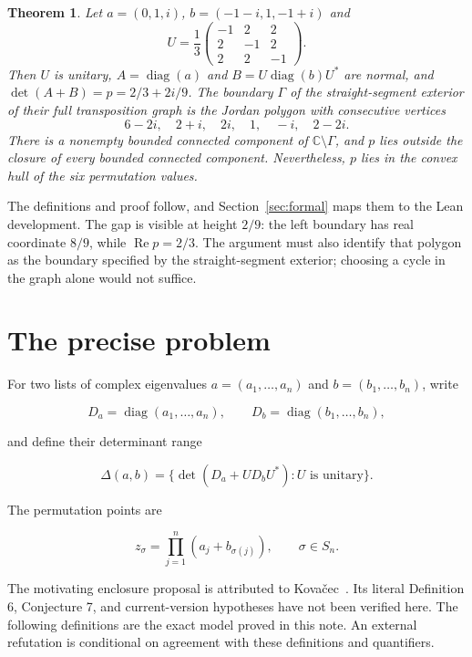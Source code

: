 \documentclass[11pt]{article}
\newtheorem{theorem}{Theorem}
\begin{document}
\begin{theorem}\label{thm:main}
Let $a=(0,1,i)$, $b=(-1-i,1,-1+i)$ and
\[
 U=\frac13\begin{pmatrix}-1&2&2\\2&-1&2\\2&2&-1\end{pmatrix}.
\]
Then $U$ is unitary, $A=\operatorname{diag}(a)$ and $B=U\operatorname{diag}(b)U^*$ are normal, and $\det(A+B)=p=2/3+2i/9$.
The boundary $\Gamma$ of the straight-segment exterior of their full transposition graph is the Jordan polygon with consecutive vertices
\[
 6-2i,\quad2+i,\quad2i,\quad1,\quad-i,\quad2-2i.
\]
There is a nonempty bounded connected component of $\mathbb C\setminus\Gamma$, and $p$ lies outside the closure of every bounded connected component. Nevertheless, $p$ lies in the convex hull of the six permutation values.
\end{theorem}

The definitions and proof follow, and Section~\ref{sec:formal} maps them to the Lean development. The gap is visible at height $2/9$: the left boundary has real coordinate $8/9$, while $\operatorname{Re}p=2/3$. The argument must also identify that polygon as the boundary specified by the straight-segment exterior; choosing a cycle in the graph alone would not suffice.

\section{The precise problem}\label{the-precise-problem}

For two lists of complex eigenvalues \(a=(a_1,\ldots,a_n)\) and
\(b=(b_1,\ldots,b_n)\), write

\[
D_a=\operatorname{diag}(a_1,\ldots,a_n),\qquad
D_b=\operatorname{diag}(b_1,\ldots,b_n),
\]

and define their determinant range

\[
\Delta(a,b)=\{\det(D_a+UD_bU^*):U\text{ is unitary}\}.
\]

The permutation points are

\[
z_\sigma=\prod_{j=1}^n(a_j+b_{\sigma(j)}),\qquad \sigma\in S_n.
\]

The motivating enclosure proposal is attributed to
Kova\v{c}ec~\cite{kovacec2026}. Its literal Definition 6, Conjecture 7,
and current-version hypotheses have not been verified here. The following
definitions are the exact model proved in this note. An external
refutation is conditional on agreement with these definitions and
quantifiers.
\end{document}
